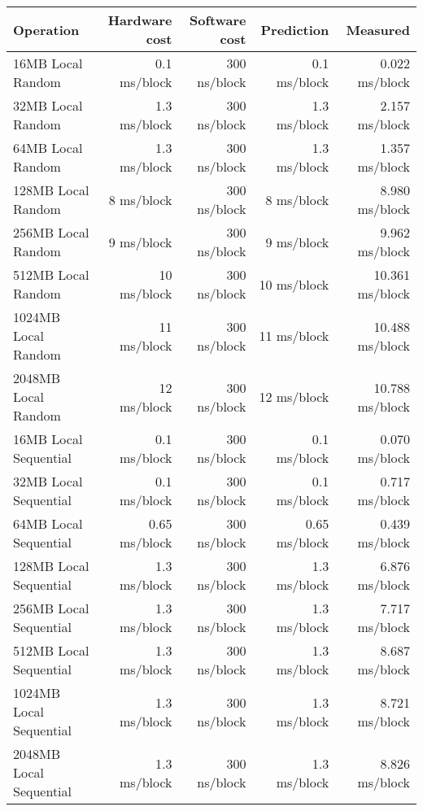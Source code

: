 \begin{table}[h]
\begin{center}
\begin{tabular}{| l | r | r | r | r |} \hline
Operation 			& Hardware cost 	& Software cost 	& Prediction	& Measured \\ \hline





16MB Local Random		& 0.1 ms/block		& 300 ns/block     & 0.1 ms/block	        & 0.022  ms/block \\ \hline
32MB Local Random		& 1.3 ms/block		& 300 ns/block     & 1.3 ms/block	        & 2.157  ms/block \\ \hline
64MB Local Random		& 1.3 ms/block		& 300 ns/block     & 1.3 ms/block	        & 1.357  ms/block \\ \hline
128MB Local Random 		& 8 ms/block		& 300 ns/block     & 8 ms/block	       & 8.980  ms/block \\ \hline
256MB Local Random		& 9 ms/block		& 300 ns/block     & 9 ms/block	       & 9.962  ms/block \\ \hline
512MB Local Random		& 10 ms/block		& 300 ns/block     & 10 ms/block	        & 10.361  ms/block \\ \hline
1024MB Local Random		& 11 ms/block		& 300 ns/block     & 11 ms/block	        & 10.488  ms/block \\ \hline
2048MB Local Random		& 12 ms/block		& 300 ns/block     & 12 ms/block	        & 10.788  ms/block \\ \hline\hline
                                                                                   
16MB Local Sequential		& 0.1 ms/block		& 300 ns/block     & 0.1 ms/block	        & 0.070   ms/block \\ \hline
32MB Local Sequential		& 0.1 ms/block		& 300 ns/block     & 0.1 ms/block	        & 0.717   ms/block \\ \hline
64MB Local Sequential		& 0.65 ms/block		& 300 ns/block     & 0.65 ms/block	        & 0.439   ms/block \\ \hline
128MB Local Sequential 	& 1.3 ms/block		& 300 ns/block     & 1.3 ms/block	        & 6.876   ms/block \\ \hline
256MB Local Sequential	& 1.3 ms/block		& 300 ns/block     & 1.3 ms/block	        & 7.717   ms/block \\ \hline
512MB Local Sequential	& 1.3 ms/block		& 300 ns/block     & 1.3 ms/block	        & 8.687   ms/block \\ \hline
1024MB Local Sequential	& 1.3 ms/block		& 300 ns/block     & 1.3 ms/block	        & 8.721   ms/block \\ \hline
2048MB Local Sequential	& 1.3 ms/block		& 300 ns/block     & 1.3 ms/block	        & 8.826   ms/block \\ \hline\hline


\end{tabular}
\end{center}
\end{table}
